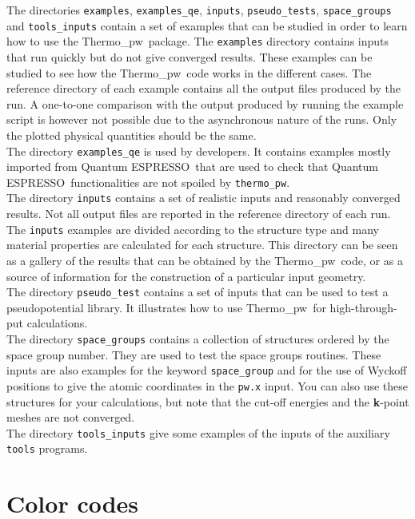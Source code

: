 \documentclass[12pt,a4paper,twoside]{report}
\def\qe{{\sc Quantum ESPRESSO}}
\def\thermo{{\sc Thermo}\_{\sc pw}}
\begin{document}
The directories \texttt{examples}, \texttt{examples\_qe}, \texttt{inputs}, 
\texttt{pseudo\_tests}, \texttt{space\_groups} and \texttt{tools\_inputs} 
contain a set of examples that can be studied in order to learn how to 
use the \thermo\ package. The \texttt{examples} directory contains inputs 
that run quickly but do not give converged results. These examples can 
be studied 
to see how the \thermo\ code works in the different cases. The
reference directory of each example contains all the output
files produced by the run. A one-to-one comparison with the output
produced by running the example script is however not possible due to the
asynchronous nature of the runs. Only the plotted physical quantities 
should be the same. \\
The directory \texttt{examples\_qe} is used by developers. It
contains examples mostly imported from \qe\ that are used to check that
\qe\ functionalities are not spoiled by \texttt{thermo\_pw}. \\
The directory \texttt{inputs} contains a set
of realistic inputs and reasonably converged results. Not all
output files are reported in the reference directory of each run. 
The \texttt{inputs} examples are divided according to the structure type
and many material properties are calculated for each structure.
This directory can be seen as a gallery of the results that can be
obtained by the \thermo\ code, or as a source of information for the
construction of a particular input geometry. \\
The directory \texttt{pseudo\_test} contains a set of inputs that can
be used to test a pseudopotential library. It illustrates how to use \thermo\ 
for high-through-put calculations. \\
The directory \texttt{space\_groups} contains a collection of structures
ordered by the space group number. They are used to test the space
groups routines. These inputs are also examples for the
keyword \texttt{space\_group} and for the use of Wyckoff positions to give the
atomic coordinates in the \texttt{pw.x} input. You can also use these
structures for your calculations, but note that the cut-off energies and
the {\bf k}-point meshes are not converged. \\
The directory \texttt{tools\_inputs} give some examples of the inputs of
the auxiliary \texttt{tools} programs.



\newpage
{\color{dark-blue}\chapter{Color codes}}
\color{black}
\end{document}

